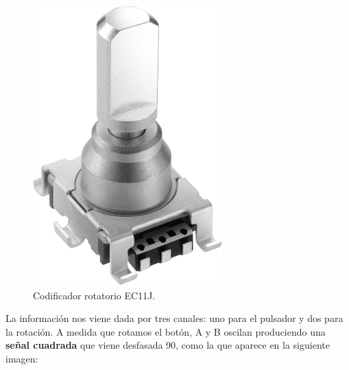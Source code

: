 \begin{figure}[H]
	\noindent \begin{centering}
		\includegraphics[width=\linewidth/4]{capitulo3/rotary}
		\par\end{centering}
	\smallskip
	\caption{\label{fig:rotary} Codificador rotatorio EC11J.}
\end{figure} 

\smallskip

La información nos viene dada por tres canales: uno para el pulsador y dos para la rotación. A medida que rotamos el botón, A y B oscilan produciendo una \textbf{señal cuadrada} que viene desfasada 90\textdegree, como la que aparece en la siguiente imagen:

\smallskip

